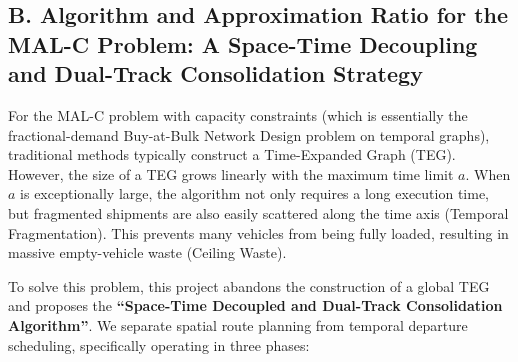 \documentclass[12pt, a4paper]{article}
\begin{document}
\subsection*{B. Algorithm and Approximation Ratio for the MAL-C Problem: A Space-Time Decoupling and Dual-Track Consolidation Strategy}

For the MAL-C problem with capacity constraints (which is essentially the fractional-demand Buy-at-Bulk Network Design problem on temporal graphs), traditional methods typically construct a Time-Expanded Graph (TEG). However, the size of a TEG grows linearly with the maximum time limit $a$. When $a$ is exceptionally large, the algorithm not only requires a long execution time, but fragmented shipments are also easily scattered along the time axis (Temporal Fragmentation). This prevents many vehicles from being fully loaded, resulting in massive empty-vehicle waste (Ceiling Waste).

To solve this problem, this project abandons the construction of a global TEG and proposes the \textbf{``Space-Time Decoupled and Dual-Track Consolidation Algorithm''}. We separate spatial route planning from temporal departure scheduling, specifically operating in three phases:
\end{document}
